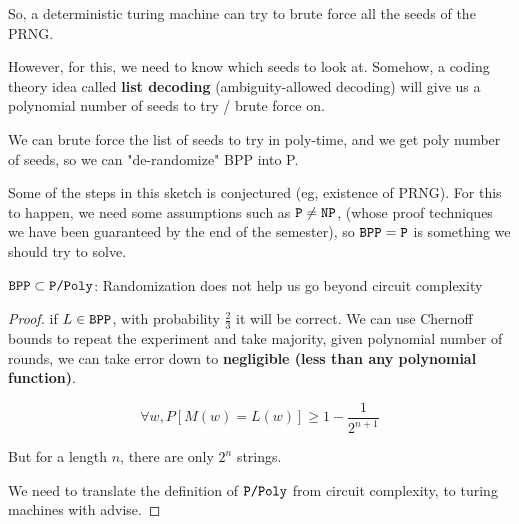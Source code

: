 So, a deterministic turing machine can try to brute force all the seeds
of the PRNG.

However, for this, we need to know which seeds to look at. Somehow,
a coding theory idea called \textbf{list decoding} (ambiguity-allowed decoding)
will give us a polynomial number of seeds to try / brute force on.

We can brute force the list of seeds to try in poly-time, and we get poly
number of seeds, so we can "de-randomize" BPP into P.

Some of the steps in this sketch is conjectured (eg, existence of PRNG).  
For this to happen, we need some assumptions such as $\texttt{P} \neq \texttt{NP}$,
(whose proof techniques we have been guaranteed by the end of the semester),
so $\texttt{BPP} = \texttt{P}$ is something we should try to solve.

\begin{theorem}
$\texttt{BPP} \subset \texttt{P/Poly}$: Randomization does not help us go beyond circuit complexity
\end{theorem}
\begin{proof}
if $L \in \texttt{BPP}$, with probability $\frac{2}{3}$ it will be correct. We can
use Chernoff bounds to repeat the experiment and take majority, given
polynomial number of rounds, we can take error down to \textbf{negligible (less
than any polynomial function)}.

$$
\forall w, P[M(w)=L(w)] \geq 1 - \frac{1}{2^{n + 1}}
$$

But for a length $n$, there are only $2^n$ strings.

We need to translate the definition of $\texttt{P/Poly}$ from circuit complexity, to
turing machines with advise.
\end{proof}
